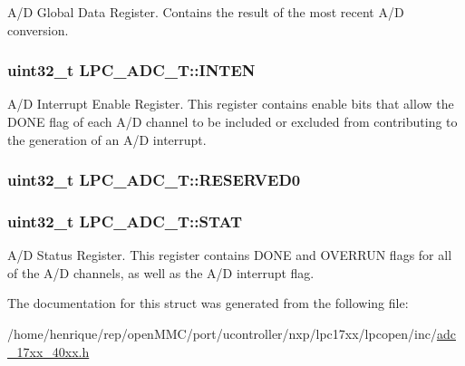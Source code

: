 A/\-D Global Data Register. Contains the result of the most recent A/\-D conversion. \hypertarget{structLPC__ADC__T_a3ed883c378f817342d10cb7ed29a05ae}{
\subsubsection[{I\-N\-T\-E\-N}]{ uint32\-\_\-t L\-P\-C\-\_\-\-A\-D\-C\-\_\-\-T\-::\-I\-N\-T\-E\-N}}\label{structLPC__ADC__T_a3ed883c378f817342d10cb7ed29a05ae}
A/\-D Interrupt Enable Register. This register contains enable bits that allow the D\-O\-N\-E flag of each A/\-D channel to be included or excluded from contributing to the generation of an A/\-D interrupt. \hypertarget{structLPC__ADC__T_afeba3e59f72b009dfb03377557ddcd60}{
\subsubsection[{R\-E\-S\-E\-R\-V\-E\-D0}]{ uint32\-\_\-t L\-P\-C\-\_\-\-A\-D\-C\-\_\-\-T\-::\-R\-E\-S\-E\-R\-V\-E\-D0}}\label{structLPC__ADC__T_afeba3e59f72b009dfb03377557ddcd60}
\hypertarget{structLPC__ADC__T_a6fd64c9a5717b2adc106721eb9ab190b}{
\subsubsection[{S\-T\-A\-T}]{ uint32\-\_\-t L\-P\-C\-\_\-\-A\-D\-C\-\_\-\-T\-::\-S\-T\-A\-T}}\label{structLPC__ADC__T_a6fd64c9a5717b2adc106721eb9ab190b}
A/\-D Status Register. This register contains D\-O\-N\-E and O\-V\-E\-R\-R\-U\-N flags for all of the A/\-D channels, as well as the A/\-D interrupt flag. 

The documentation for this struct was generated from the following file\-:\begin{DoxyCompactItemize}
\item 
/home/henrique/rep/open\-M\-M\-C/port/ucontroller/nxp/lpc17xx/lpcopen/inc/\hyperlink{adc__17xx__40xx_8h}{adc\-\_\-17xx\-\_\-40xx.\-h}\end{DoxyCompactItemize}
